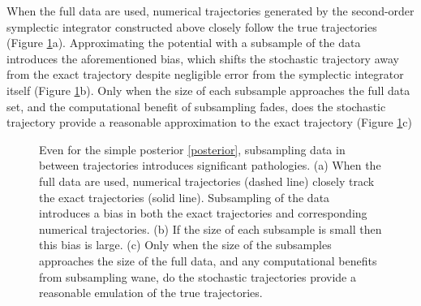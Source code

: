 \documentclass{article}
\begin{document}
When the full data are used, numerical trajectories generated by the second-order 
symplectic integrator constructed above closely follow the true trajectories 
(Figure \ref{fig:level_sets}a).  Approximating the potential with a subsample of the data 
introduces the aforementioned bias, which shifts the stochastic trajectory away from the 
exact trajectory despite negligible error from the symplectic integrator itself (Figure \ref{fig:level_sets}b).
Only when the size of each subsample approaches the full data set, and the computational
benefit of subsampling fades, does the stochastic trajectory provide a reasonable
approximation to the exact trajectory (Figure \ref{fig:level_sets}c)

\begin{figure}
\centering
{}
\caption{Even for the simple posterior \eqref{posterior}, subsampling
data in between trajectories introduces significant pathologies.
(a) When the full data are used, numerical trajectories (dashed line) 
closely track the exact trajectories (solid line).  Subsampling of the
data introduces a bias in both the exact trajectories and corresponding
numerical trajectories.  (b) If the size of each subsample is small then this bias 
is large. (c) Only when the size of the subsamples approaches the size of the 
full data, and any computational benefits from subsampling wane, do the stochastic 
trajectories provide a reasonable emulation of the true trajectories.}
\label{fig:level_sets}
\end{figure}
\end{document}
